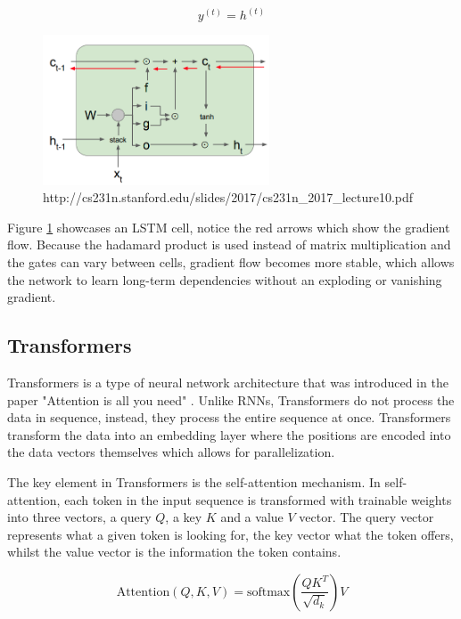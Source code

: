 \documentclass[11pt]{article}
\begin{document}
\begin{equation} y^{(t)} = h^{(t)} \end{equation}

\begin{figure}[h]
\centering
\includegraphics[width=0.6\textwidth]{lstm_diagram.png}
\caption{http://cs231n.stanford.edu/slides/2017/cs231n\_2017\_lecture10.pdf}
\label{fig:lstm_diagram}
\end{figure}

Figure \ref{fig:lstm_diagram} showcases an LSTM cell, notice the red arrows which show the gradient flow. Because the hadamard product is used instead of matrix multiplication and the gates can vary between cells, gradient flow becomes more stable, which allows the network to learn long-term dependencies without an exploding or vanishing gradient.
\subsection{Transformers}

Transformers is a type of neural network architecture that was introduced in the paper "Attention is all you need" \cite{DBLP:journals/corr/VaswaniSPUJGKP17}. Unlike RNNs, Transformers do not process the data in sequence, instead, they process the entire sequence at once. Transformers transform the data into an embedding layer where the positions are encoded into the data vectors themselves which allows for parallelization.

The key element in Transformers is the self-attention mechanism. In self-attention, each token in the input sequence is transformed with trainable weights into three vectors, a query $Q$, a key $K$ and a value $V$ vector. The query vector represents what a given token is looking for, the key vector what the token offers, whilst the value vector is the information the token contains.

$$\text{Attention}(Q, K , V) = \text{softmax}\left(\frac{QK^T}{\sqrt{d_k}}\right)V$$
\end{document}
